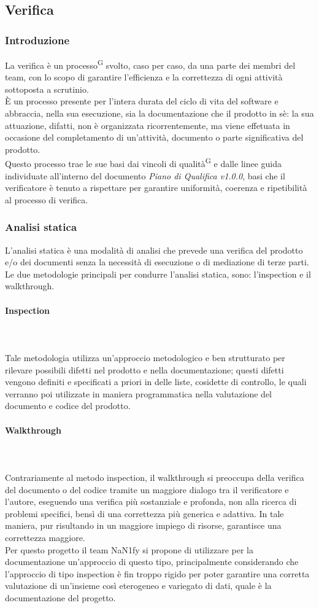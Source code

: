 \documentclass[8pt]{article}
\newcommand{\glossterm}[1]{#1\textsuperscript{G}} %
\newcommand{\subsubsubsection}[1]{\paragraph{#1}\mbox{}\\}
\begin{document}
\subsection{Verifica} \label{sec:verifica}
\subsubsection{Introduzione}
La verifica è un \glossterm{processo} svolto, caso per caso, da una parte dei membri del team, con lo scopo di garantire l'efficienza e la correttezza di ogni attività sottoposta a scrutinio. \\
È un processo presente per l'intera durata del ciclo di vita del software e abbraccia, nella sua esecuzione, sia la documentazione che il prodotto in sè: la sua attuazione, difatti, non è organizzata ricorrentemente, ma viene effetuata in occasione del completamento di un'attività, documento o parte significativa del prodotto. \\
Questo processo trae le sue basi dai vincoli di \glossterm{qualità} e dalle linee guida individuate all'interno
del documento \textit{Piano di Qualifica v1.0.0}, basi che il verificatore è tenuto a rispettare per garantire uniformità, coerenza e ripetibilità al processo di verifica.
\subsubsection{Analisi statica}
L'analisi statica è una modalità di analisi che prevede una verifica del prodotto e/o dei documenti senza la necessità di esecuzione o di mediazione di terze parti. \\
Le due metodologie principali per condurre l'analisi statica, sono: l'inspection e il walkthrough.
\subsubsubsection{Inspection} \\
Tale metodologia utilizza un'approccio metodologico e ben strutturato per rilevare possibili difetti nel prodotto e nella documentazione; questi difetti vengono definiti e specificati a priori in delle liste, cosidette di controllo, le quali verranno poi utilizzate in maniera programmatica nella valutazione del documento e codice del prodotto.
\subsubsubsection{Walkthrough} \\
Contrariamente al metodo inspection, il walkthrough si preoccupa della verifica del documento o del codice tramite un maggiore dialogo tra il verificatore e l'autore, eseguendo una verifica più sostanziale e profonda, non alla ricerca di problemi specifici, bensì di una correttezza più generica e adattiva. In tale maniera, pur risultando in un maggiore impiego di risorse, garantisce una correttezza maggiore. \\
Per questo progetto il team NaN1fy si propone di utilizzare per la documentazione un'approccio di questo tipo, principalmente considerando che l'approccio di tipo inspection è fin troppo rigido per poter garantire una corretta valutazione di un'insieme così eterogeneo e variegato di dati, quale è la documentazione del progetto.
\end{document}
